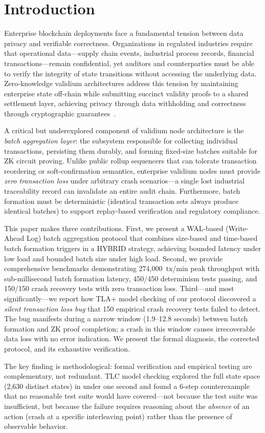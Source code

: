 
\section{Introduction}

Enterprise blockchain deployments face a fundamental tension between data privacy
and verifiable correctness. Organizations in regulated industries require that
operational data---supply chain events, industrial process records, financial
transactions---remain confidential, yet auditors and counterparties must be able
to verify the integrity of state transitions without accessing the underlying data.
Zero-knowledge validium architectures address this tension by maintaining enterprise
state off-chain while submitting succinct validity proofs to a shared settlement layer,
achieving privacy through data withholding and correctness through cryptographic
guarantees~\cite{chaliasos2024analyzing}.

A critical but underexplored component of validium node architecture is the
\emph{batch aggregation layer}: the subsystem responsible for collecting individual
transactions, persisting them durably, and forming fixed-size batches suitable for
ZK circuit proving. Unlike public rollup sequencers that can tolerate transaction
reordering or soft-confirmation semantics, enterprise validium nodes must provide
\emph{zero transaction loss} under arbitrary crash scenarios---a single lost
industrial traceability record can invalidate an entire audit chain. Furthermore,
batch formation must be deterministic (identical transaction sets always produce
identical batches) to support replay-based verification and regulatory compliance.

This paper makes three contributions. First, we present a WAL-based (Write-Ahead Log)
batch aggregation protocol that combines size-based and time-based batch formation
triggers in a HYBRID strategy, achieving bounded latency under low load and bounded
batch size under high load. Second, we provide comprehensive benchmarks demonstrating
274,000~tx/min peak throughput with sub-millisecond batch formation latency, 450/450
determinism tests passing, and 150/150 crash recovery tests with zero transaction loss.
Third---and most significantly---we report how TLA+ model checking of our protocol
discovered a \emph{silent transaction loss bug} that 150 empirical crash recovery
tests failed to detect. The bug manifests during a narrow window (1.9--12.8 seconds)
between batch formation and ZK proof completion; a crash in this window causes
irrecoverable data loss with no error indication. We present the formal diagnosis,
the corrected protocol, and its exhaustive verification.

The key finding is methodological: formal verification and empirical testing are
complementary, not redundant. TLC model checking explored the full state space
(2,630 distinct states) in under one second and found a 6-step counterexample that
no reasonable test suite would have covered---not because the test suite was
insufficient, but because the failure requires reasoning about the \emph{absence}
of an action (crash at a specific interleaving point) rather than the presence of
observable behavior.
